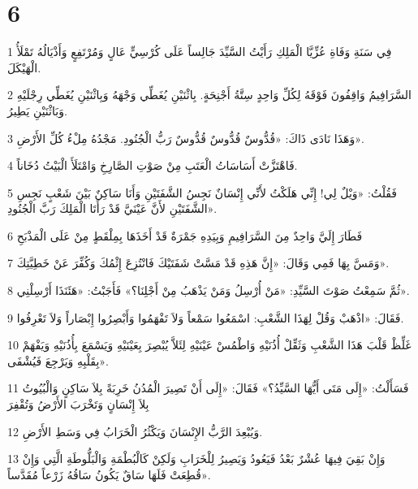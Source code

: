 \chapter{6}

\par 1 فِي سَنَةِ وَفَاةِ عُزِّيَّا الْمَلِكِ رَأَيْتُ السَّيِّدَ جَالِساً عَلَى كُرْسِيٍّ عَالٍ وَمُرْتَفِعٍ وَأَذْيَالُهُ تَمْلَأُ الْهَيْكَلَ.
\par 2 السَّرَافِيمُ وَاقِفُونَ فَوْقَهُ لِكُلِّ وَاحِدٍ سِتَّةُ أَجْنِحَةٍ. بِاثْنَيْنِ يُغَطِّي وَجْهَهُ وَبِاثْنَيْنِ يُغَطِّي رِجْلَيْهِ وَبَاثْنَيْنِ يَطِيرُ.
\par 3 وَهَذَا نَادَى ذَاكَ: «قُدُّوسٌ قُدُّوسٌ قُدُّوسٌ رَبُّ الْجُنُودِ. مَجْدُهُ مِلْءُ كُلِّ الأَرْضِ».
\par 4 فَاهْتَزَّتْ أَسَاسَاتُ الْعَتَبِ مِنْ صَوْتِ الصَّارِخِ وَامْتَلَأَ الْبَيْتُ دُخَاناً.
\par 5 فَقُلْتُ: «وَيْلٌ لِي! إِنِّي هَلَكْتُ لأَنِّي إِنْسَانٌ نَجِسُ الشَّفَتَيْنِ وَأَنَا سَاكِنٌ بَيْنَ شَعْبٍ نَجِسِ الشَّفَتَيْنِ لأَنَّ عَيْنَيَّ قَدْ رَأَتَا الْمَلِكَ رَبَّ الْجُنُودِ».
\par 6 فَطَارَ إِلَيَّ وَاحِدٌ مِنَ السَّرَافِيمِ وَبِيَدِهِ جَمْرَةٌ قَدْ أَخَذَهَا بِمِلْقَطٍ مِنْ عَلَى الْمَذْبَحِ
\par 7 وَمَسَّ بِهَا فَمِي وَقَالَ: «إِنَّ هَذِهِ قَدْ مَسَّتْ شَفَتَيْكَ فَانْتُزِعَ إِثْمُكَ وَكُفِّرَ عَنْ خَطِيَّتِكَ».
\par 8 ثُمَّ سَمِعْتُ صَوْتَ السَّيِّدِ: «مَنْ أُرْسِلُ وَمَنْ يَذْهَبُ مِنْ أَجْلِنَا؟» فَأَجَبْتُ: «هَئَنَذَا أَرْسِلْنِي».
\par 9 فَقَالَ: «اذْهَبْ وَقُلْ لِهَذَا الشَّعْبِ: اسْمَعُوا سَمْعاً وَلاَ تَفْهَمُوا وَأَبْصِرُوا إِبْصَاراً وَلاَ تَعْرِفُوا.
\par 10 غَلِّظْ قَلْبَ هَذَا الشَّعْبِ وَثَقِّلْ أُذُنَيْهِ وَاطْمُسْ عَيْنَيْهِ لِئَلاَّ يُبْصِرَ بِعَيْنَيْهِ وَيَسْمَعَ بِأُذُنَيْهِ وَيَفْهَمْ بِقَلْبِهِ وَيَرْجِعَ فَيُشْفَى».
\par 11 فَسَأَلْتُ: «إِلَى مَتَى أَيُّهَا السَّيِّدُ؟» فَقَالَ: «إِلَى أَنْ تَصِيرَ الْمُدُنُ خَرِبَةً بِلاَ سَاكِنٍ وَالْبُيُوتُ بِلاَ إِنْسَانٍ وَتَخْرَبَ الأَرْضُ وَتُقْفِرَ
\par 12 وَيُبْعِدَ الرَّبُّ الإِنْسَانَ وَيَكْثُرُ الْخَرَابُ فِي وَسَطِ الأَرْضِ.
\par 13 وَإِنْ بَقِيَ فِيهَا عُشْرٌ بَعْدُ فَيَعُودُ وَيَصِيرُ لِلْخَرَابِ وَلَكِنْ كَالْبُطْمَةِ وَالْبَلُّوطَةِ الَّتِي وَإِنْ قُطِعَتْ فَلَهَا سَاقٌ يَكُونُ سَاقُهُ زَرْعاً مُقَدَّساً».

